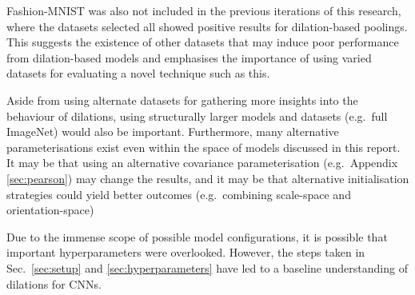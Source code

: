 \documentclass[a4paper, 12pt]{report}
\begin{document}
Fashion-MNIST was also not included in the previous iterations of this research, where the datasets selected all showed positive results for dilation-based poolings. This suggests the existence of other datasets that may induce poor performance from dilation-based models and emphasises the importance of using varied datasets for evaluating a novel technique such as this.

Aside from using alternate datasets for gathering more insights into the behaviour of dilations, using structurally larger models and datasets (e.g.\ full ImageNet) would also be important. Furthermore, many alternative parameterisations exist even within the space of models discussed in this report. It may be that using an alternative covariance parameterisation (e.g.\ Appendix \ref{sec:pearson}) may change the results, and it may be that alternative initialisation strategies could yield better outcomes (e.g.\ combining scale-space and orientation-space)

Due to the immense scope of possible model configurations, it is possible that important hyperparameters were overlooked. However, the steps taken in Sec.\ \ref{sec:setup} and \ref{sec:hyperparameters} have led to a baseline understanding of dilations for CNNs.



\newpage
\end{document}
